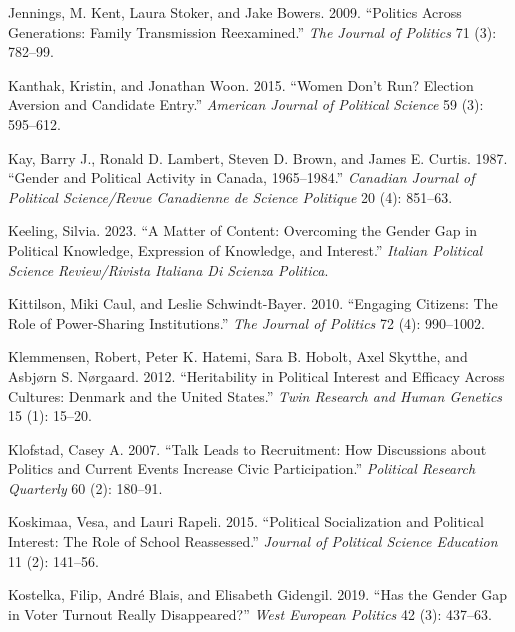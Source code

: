 \documentclass[
  letterpaper,
  DIV=11,
  numbers=noendperiod]{scrreprt}
\newlength{\cslhangindent}
\newlength{\cslentryspacingunit} %
\newenvironment{CSLReferences}[2] %
 {%
  \setlength{\parindent}{0pt}
  \ifodd #1
  \let\oldpar\par
  \def\par{\hangindent=\cslhangindent\oldpar}
  \fi
  \setlength{\parskip}{#2\cslentryspacingunit}
 }%
 {}
\begin{document}
\begin{CSLReferences}{1}{0}
\leavevmode{}%
Jennings, M. Kent, Laura Stoker, and Jake Bowers. 2009. {``{Politics
Across Generations: Family Transmission Reexamined}.''} \emph{The
Journal of Politics} 71 (3): 782--99.

\leavevmode{}%
Kanthak, Kristin, and Jonathan Woon. 2015. {``{Women Don't Run? Election
Aversion and Candidate Entry}.''} \emph{American Journal of Political
Science} 59 (3): 595--612.

\leavevmode{}%
Kay, Barry J., Ronald D. Lambert, Steven D. Brown, and James E. Curtis.
1987. {``{Gender and Political Activity in Canada, 1965--1984}.''}
\emph{Canadian Journal of Political Science/Revue Canadienne de Science
Politique} 20 (4): 851--63.

\leavevmode{}%
Keeling, Silvia. 2023. {``{A Matter of Content: Overcoming the Gender
Gap in Political Knowledge, Expression of Knowledge, and Interest}.''}
\emph{Italian Political Science Review/Rivista Italiana Di Scienza
Politica}.

\leavevmode{}%
Kittilson, Miki Caul, and Leslie Schwindt-Bayer. 2010. {``Engaging
Citizens: The Role of Power-Sharing Institutions.''} \emph{The Journal
of Politics} 72 (4): 990--1002.

\leavevmode{}%
Klemmensen, Robert, Peter K. Hatemi, Sara B. Hobolt, Axel Skytthe, and
Asbjørn S. Nørgaard. 2012. {``{Heritability in Political Interest and
Efficacy Across Cultures: Denmark and the United States}.''} \emph{Twin
Research and Human Genetics} 15 (1): 15--20.

\leavevmode{}%
Klofstad, Casey A. 2007. {``{Talk Leads to Recruitment: How Discussions
about Politics and Current Events Increase Civic Participation}.''}
\emph{Political Research Quarterly} 60 (2): 180--91.

\leavevmode{}%
Koskimaa, Vesa, and Lauri Rapeli. 2015. {``{Political Socialization and
Political Interest: The Role of School Reassessed}.''} \emph{Journal of
Political Science Education} 11 (2): 141--56.

\leavevmode{}%
Kostelka, Filip, André Blais, and Elisabeth Gidengil. 2019. {``{Has the
Gender Gap in Voter Turnout Really Disappeared?}''} \emph{West European
Politics} 42 (3): 437--63.


\end{CSLReferences}
\end{document}
